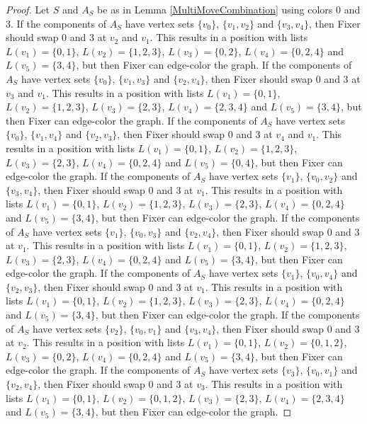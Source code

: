 \documentclass[12pt]{amsart}
\theoremstyle{plain}
\theoremstyle{definition}
\theoremstyle{remark}
\begin{document}
\begin{proof}
Let $S$ and $A_S$ be as in Lemma \ref{MultiMoveCombination} using colors $0$ and $3$. If the components of $A_S$ have vertex sets $\{v_0\}$, $\{v_1, v_2\}$ and $\{v_3, v_4\}$, then Fixer should swap 0 and 3 at $v_2$ and $v_1$. This results in a position with lists $L(v_1) = \{0, 1\}$, $L(v_2) = \{1, 2, 3\}$, $L(v_3) = \{0, 2\}$, $L(v_4) = \{0, 2, 4\}$ and $L(v_5) = \{3, 4\}$, but then Fixer can edge-color the graph.
If the components of $A_S$ have vertex sets $\{v_0\}$, $\{v_1, v_3\}$ and $\{v_2, v_4\}$, then Fixer should swap 0 and 3 at $v_3$ and $v_1$. This results in a position with lists $L(v_1) = \{0, 1\}$, $L(v_2) = \{1, 2, 3\}$, $L(v_3) = \{2, 3\}$, $L(v_4) = \{2, 3, 4\}$ and $L(v_5) = \{3, 4\}$, but then Fixer can edge-color the graph.
If the components of $A_S$ have vertex sets $\{v_0\}$, $\{v_1, v_4\}$ and $\{v_2, v_3\}$, then Fixer should swap 0 and 3 at $v_4$ and $v_1$. This results in a position with lists $L(v_1) = \{0, 1\}$, $L(v_2) = \{1, 2, 3\}$, $L(v_3) = \{2, 3\}$, $L(v_4) = \{0, 2, 4\}$ and $L(v_5) = \{0, 4\}$, but then Fixer can edge-color the graph.
If the components of $A_S$ have vertex sets $\{v_1\}$, $\{v_0, v_2\}$ and $\{v_3, v_4\}$, then Fixer should swap 0 and 3 at $v_1$. This results in a position with lists $L(v_1) = \{0, 1\}$, $L(v_2) = \{1, 2, 3\}$, $L(v_3) = \{2, 3\}$, $L(v_4) = \{0, 2, 4\}$ and $L(v_5) = \{3, 4\}$, but then Fixer can edge-color the graph.
If the components of $A_S$ have vertex sets $\{v_1\}$, $\{v_0, v_3\}$ and $\{v_2, v_4\}$, then Fixer should swap 0 and 3 at $v_1$. This results in a position with lists $L(v_1) = \{0, 1\}$, $L(v_2) = \{1, 2, 3\}$, $L(v_3) = \{2, 3\}$, $L(v_4) = \{0, 2, 4\}$ and $L(v_5) = \{3, 4\}$, but then Fixer can edge-color the graph.
If the components of $A_S$ have vertex sets $\{v_1\}$, $\{v_0, v_4\}$ and $\{v_2, v_3\}$, then Fixer should swap 0 and 3 at $v_1$. This results in a position with lists $L(v_1) = \{0, 1\}$, $L(v_2) = \{1, 2, 3\}$, $L(v_3) = \{2, 3\}$, $L(v_4) = \{0, 2, 4\}$ and $L(v_5) = \{3, 4\}$, but then Fixer can edge-color the graph.
If the components of $A_S$ have vertex sets $\{v_2\}$, $\{v_0, v_1\}$ and $\{v_3, v_4\}$, then Fixer should swap 0 and 3 at $v_2$. This results in a position with lists $L(v_1) = \{0, 1\}$, $L(v_2) = \{0, 1, 2\}$, $L(v_3) = \{0, 2\}$, $L(v_4) = \{0, 2, 4\}$ and $L(v_5) = \{3, 4\}$, but then Fixer can edge-color the graph.
If the components of $A_S$ have vertex sets $\{v_3\}$, $\{v_0, v_1\}$ and $\{v_2, v_4\}$, then Fixer should swap 0 and 3 at $v_3$. This results in a position with lists $L(v_1) = \{0, 1\}$, $L(v_2) = \{0, 1, 2\}$, $L(v_3) = \{2, 3\}$, $L(v_4) = \{2, 3, 4\}$ and $L(v_5) = \{3, 4\}$, but then Fixer can edge-color the graph.

\end{proof}
\end{document}
